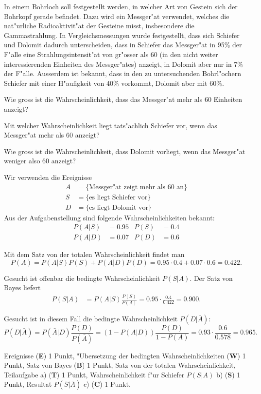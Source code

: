 In einem Bohrloch soll festgestellt werden, in welcher Art von Gestein
sich der Bohrkopf gerade befindet. Dazu wird ein Messger"at verwendet, welches
die nat"urliche Radioaktivit"at der Gesteine misst, insbesondere die
Gammastrahlung.
In Vergleichsmessungen wurde festgestellt, dass sich Schiefer
und Dolomit dadurch unterscheiden, dass in Schiefer das Messger"at
in 95\% der F"alle eine Strahlungsintensit"at von gr"osser als 60 (in den
nicht weiter interessierenden Einheiten des Messger"ates) anzeigt,
in Dolomit aber nur in 7\% der F"alle.
Ausserdem ist bekannt, dass in den zu untersuchenden Bohrl"ochern
Schiefer mit einer H"aufigkeit von 40\% vorkommt, Dolomit aber mit 60\%.
\begin{teilaufgaben}
\item
Wie gross ist die Wahrscheinlichkeit, dass das Messger"at mehr als 60
Einheiten anzeigt?
\item
Mit welcher Wahrscheinlichkeit liegt tats"achlich Schiefer vor, wenn 
das Messger"at mehr als 60 anzeigt?
\item
Wie gross ist die Wahrscheinlichkeit, dass Dolomit vorliegt, wenn
das Messger"at weniger also 60 anzeigt?
\end{teilaufgaben}


\begin{loesung}
Wir verwenden die Ereignisse
\begin{align*}
A&=\{\text{Messger"at zeigt mehr als 60 an}\}\\
S&=\{\text{es liegt Schiefer vor}\}\\
D&=\{\text{es liegt Dolomit vor}\}
\end{align*}
Aus der Aufgabenstellung sind folgende Wahrscheinlichkeiten bekannt:
\begin{align*}
P(A|S)&=0.95&
P(S)&=0.4\\
P(A|D)&=0.07&
P(D)&=0.6
\end{align*}
\begin{teilaufgaben}
\item Mit dem Satz von der totalen Wahrscheinlichkeit findet man
\[
P(A)=P(A|S)P(S)+P(A|D)P(D)=0.95\cdot 0.4+0.07\cdot 0.6=0.422.
\]
\item Gesucht ist offenbar die bedingte Wahrscheinlichkeit $P(S|A)$. Der
Satz von Bayes liefert
\begin{align*}
P(S|A)&=P(A|S)\frac{P(S)}{P(A)}=0.95\cdot\frac{0.4}{0.422}=0.900.
\end{align*}
\item
Gesucht ist in diesem Fall die bedingte Wahrscheinlichkeit $P(D|\bar A)$:
\[
P(D|\bar A)=P(\bar A|D)\frac{P(D)}{P(\bar A)}
=(1-P(A|D))\frac{P(D)}{1-P(A)}=0.93 \cdot \frac{0.6}{0.578}=0.965.
\]
\end{teilaufgaben}
\end{loesung}


\begin{bewertung}
Ereignisse ({\bf E}) 1 Punkt,
"Ubersetzung der bedingten Wahrscheinlichkeiten ({\bf W}) 1 Punkt,
Satz von Bayes ({\bf B}) 1 Punkt,
Satz von der totalen Wahrscheinlichkeit, Teilaufgabe a) ({\bf T}) 1 Punkt,
Wahrscheinlichkeit f"ur Schiefer $P(S|A)$ b) ({\bf S}) 1 Punkt,
Resultat $P(\bar S|\bar A)$ c) ({\bf C}) 1 Punkt.
\end{bewertung}


